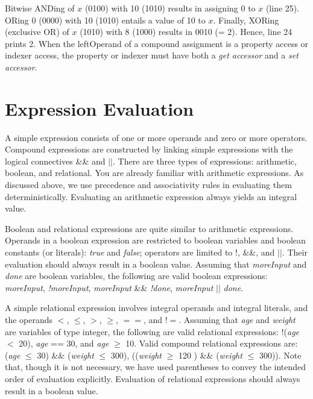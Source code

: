 Bitwise ANDing of $x$ (0100) with 10 (1010) results in assigning 0
to $x$ (line 25). ORing 0 (0000) with 10 (1010) entails a value of
10 to $x$. Finally, XORing (exclusive OR) of $x$ (1010) with 8
(1000) results in 0010 (= 2). Hence, line 24 prints 2. When the
leftOperand of a compound assignment is a property access or
indexer access, the property or indexer must have both a \emph{get
accessor} and a \emph{set accessor}.



{\samepage\vspace{1ex}\noindent\usebox{\phicsep}\vspace{1.5ex}}
\vspace{-0.4in}
\section{Expression Evaluation} \label{sec:ExprEval}


A simple expression consists of one or more operands and zero or
more operators. Compound expressions are constructed by linking
simple expressions with the logical connectives \&\& and $\vert
\vert$. There are three types of expressions: arithmetic, boolean,
and relational. You are already familiar with arithmetic
expressions. As discussed above, we use precedence and
associativity rules in evaluating them deterministically.
Evaluating an arithmetic expression always yields an integral
value.


Boolean and relational expressions are quite similar to arithmetic
expressions. Operands in a boolean expression are restricted to
boolean variables and boolean constants (or literals): \emph{true}
and \emph{false}; operators are limited to !, \&\&, and $\vert
\vert$. Their evaluation should always result in a boolean value.
Assuming that \emph{moreInput} and \emph{done} are boolean
variables, the following are valid boolean expressions:
\emph{moreInput}, \emph{!moreInput}, \emph{moreInput} \&\&
\emph{!done}, \emph{moreInput} $\vert \vert$ \emph{done}.


A simple relational expression involves integral operands and
integral literals, and the operands $<$, $\leq$, $>$, $\geq$, $=
=$, and $!=$. Assuming that \emph{age} and \emph{weight} are
variables of type integer, the following are valid relational
expressions: !(\emph{age} $<$ 20), \emph{age} == 30, and
\emph{age} $\geq$ 10. Valid compound relational expressions are:
(\emph{age} $\leq$ 30) \&\& (\emph{weight} $\leq$ 300),
((\emph{weight} $\geq$ 120 ) \&\& (\emph{weight} $\leq$ 300)).
Note that, though it is not necessary, we have used parentheses to
convey the intended order of evaluation explicitly. Evaluation of
relational expressions should always result in a boolean value.


